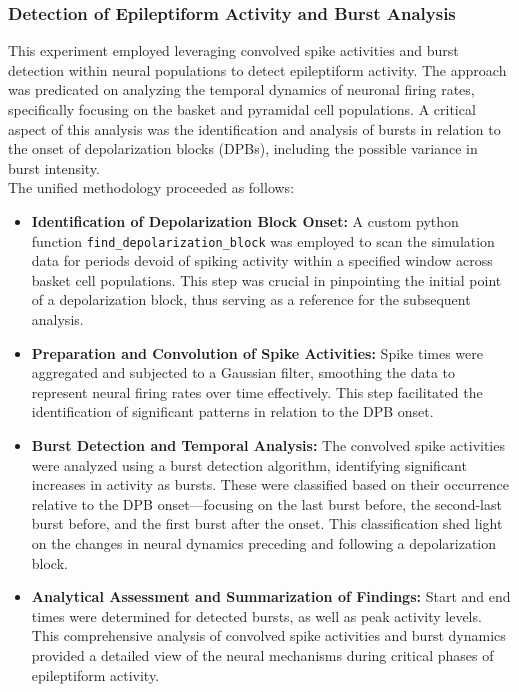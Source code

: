 \subsubsection{Detection of Epileptiform Activity and Burst Analysis}
This experiment employed leveraging convolved spike activities and burst detection within
neural populations to detect epileptiform activity. The approach was predicated on analyzing the temporal
dynamics of neuronal firing rates, specifically focusing on the basket and
pyramidal cell populations. A critical aspect of this analysis was the
identification and analysis of bursts in relation to the onset of
depolarization blocks (DPBs), including the possible variance in burst intensity.\\

\noindent The unified methodology proceeded as follows:
\begin{itemize}
    \item \textbf{Identification of Depolarization Block Onset:} A custom python function \lstinline{find_depolarization_block} was employed to scan the simulation data for periods devoid of spiking activity within a specified window across basket cell populations.
          This step was crucial in pinpointing the initial point of a depolarization block, thus serving as a reference for the subsequent analysis.

    \item \textbf{Preparation and Convolution of Spike Activities:} Spike times were aggregated and subjected to a Gaussian filter, smoothing the data to represent neural firing rates over time effectively.
          This step facilitated the identification of significant patterns in relation to the DPB onset.

    \item \textbf{Burst Detection and Temporal Analysis:} The convolved spike activities were analyzed using a burst detection algorithm, identifying significant increases in activity as bursts.
          These were classified based on their occurrence relative to the DPB onset—focusing on the last burst before, the second-last burst before, and the first burst after the onset. This classification shed light on the changes in neural dynamics preceding and following a depolarization block.

    \item \textbf{Analytical Assessment and Summarization of Findings:} Start and end times were determined for detected bursts, as well as peak activity levels.
          This comprehensive analysis of convolved spike activities and burst dynamics provided a detailed view of the neural mechanisms during critical phases of epileptiform activity.
\end{itemize}

